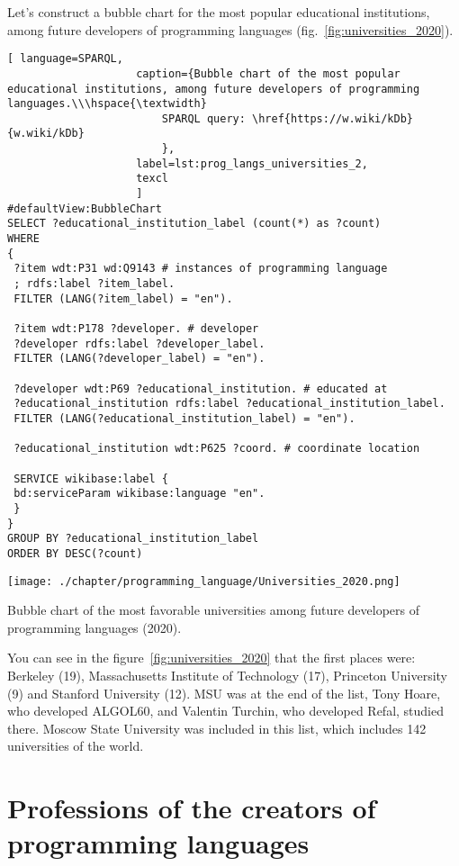 Let's construct a bubble chart for the most popular educational institutions, among future developers of programming languages (fig.~\ref{fig:universities_2020}). 

\begin{lstlisting}[ language=SPARQL, 
                    caption={Bubble chart of the most popular educational institutions, among future developers of programming languages.\\\hspace{\textwidth}
                        SPARQL query: \href{https://w.wiki/kDb}{w.wiki/kDb}
                        },
                    label=lst:prog_langs_universities_2,
                    texcl 
                    ]
#defaultView:BubbleChart
SELECT ?educational_institution_label (count(*) as ?count)
WHERE
{
 ?item wdt:P31 wd:Q9143 # instances of programming language
 ; rdfs:label ?item_label. 
 FILTER (LANG(?item_label) = "en"). 
 
 ?item wdt:P178 ?developer. # developer
 ?developer rdfs:label ?developer_label. 
 FILTER (LANG(?developer_label) = "en"). 
 	
 ?developer wdt:P69 ?educational_institution. # educated at
 ?educational_institution rdfs:label ?educational_institution_label. 
 FILTER (LANG(?educational_institution_label) = "en").
 
 ?educational_institution wdt:P625 ?coord. # coordinate location
 
 SERVICE wikibase:label {
 bd:serviceParam wikibase:language "en".
 } 	
}
GROUP BY ?educational_institution_label
ORDER BY DESC(?count)
\end{lstlisting}%

\begin{marginfigure}[-7cm]
	\texttt{[image: ./chapter/programming\_language/Universities\_2020.png]}
	\caption{Bubble chart of the most favorable universities among future developers of programming languages (2020).}
	\label{fig:universities_2020}
\end{marginfigure}

You can see in the figure~\ref{fig:universities_2020} that the first places were: Berkeley (19), Massachusetts Institute of Technology (17), Princeton University (9) and Stanford University (12). MSU was at the end of the list, Tony Hoare, who developed ALGOL60, and Valentin Turchin, who developed Refal, studied there. Moscow State University was included in this list, which includes 142 universities of the world.

\section{Professions of the creators of programming languages}

